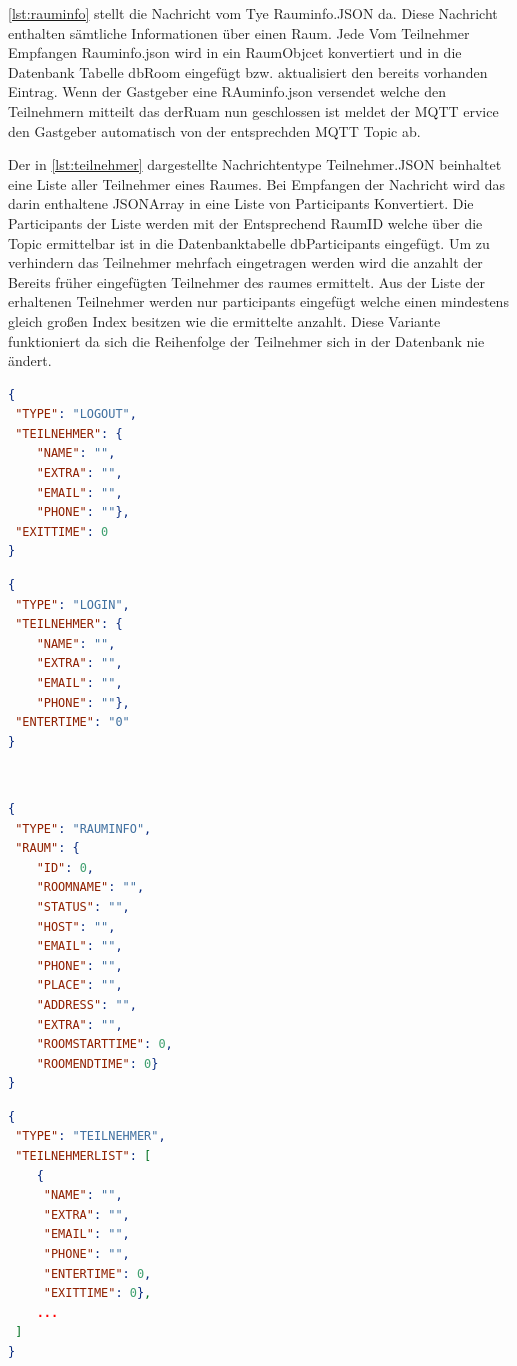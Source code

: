 \cref{lst:rauminfo} stellt die Nachricht vom Tye Rauminfo.JSON da. Diese Nachricht enthalten sämtliche Informationen über einen Raum. Jede Vom Teilnehmer Empfangen Rauminfo.json wird in ein RaumObjcet konvertiert und in die Datenbank Tabelle dbRoom eingefügt bzw. aktualisiert den bereits vorhanden Eintrag. Wenn der Gastgeber eine RAuminfo.json versendet welche den Teilnehmern mitteilt das derRuam nun geschlossen ist meldet der MQTT ervice den Gastgeber automatisch von der entsprechden MQTT Topic ab.

Der in \cref{lst:teilnehmer} dargestellte Nachrichtentype Teilnehmer.JSON beinhaltet eine Liste aller Teilnehmer eines Raumes. Bei Empfangen der Nachricht wird das darin enthaltene JSONArray in eine Liste von Participants Konvertiert. Die Participants der Liste werden mit der Entsprechend RaumID welche über die Topic ermittelbar ist in die Datenbanktabelle dbParticipants eingefügt. Um zu verhindern das Teilnehmer mehrfach eingetragen werden wird die anzahlt der Bereits früher eingefügten Teilnehmer des raumes ermittelt. Aus der Liste der erhaltenen Teilnehmer werden nur participants eingefügt welche einen mindestens gleich großen Index besitzen wie die ermittelte anzahlt. Diese Variante funktioniert da sich die Reihenfolge der Teilnehmer sich in der Datenbank nie ändert.

\begin{minipage}[t]{0.45\linewidth}
\begin{lstlisting}[language=json, label={lst:anmeldung}, caption={anmeldung.json}]
{
 "TYPE": "LOGOUT",
 "TEILNEHMER": {
	"NAME": "",
	"EXTRA": "",
	"EMAIL": "",
	"PHONE": ""},
 "EXITTIME": 0
}
\end{lstlisting}
\end{minipage}
\qquad
\begin{minipage}[t]{0.45\linewidth}
\begin{lstlisting}[language=json,label={lst:abmeldung}, caption={abmeldung.json}]
{
 "TYPE": "LOGIN",
 "TEILNEHMER": {
	"NAME": "",
	"EXTRA": "",
	"EMAIL": "",
	"PHONE": ""},
 "ENTERTIME": "0"
}
\end{lstlisting}
\end{minipage}
\\
\begin{minipage}[t]{0.45\linewidth}
\begin{lstlisting}[language=json, label={lst:rauminfo}, caption={rauminfo.json}]
{
 "TYPE": "RAUMINFO",
 "RAUM": {
	"ID": 0,
	"ROOMNAME": "",
	"STATUS": "",
	"HOST": "",
	"EMAIL": "",
	"PHONE": "",
	"PLACE": "",
	"ADDRESS": "",
	"EXTRA": "",
	"ROOMSTARTTIME": 0,
	"ROOMENDTIME": 0}
}
\end{lstlisting}
\end{minipage}
\qquad
\begin{minipage}[t]{0.45\linewidth}
\begin{lstlisting}[language=json, label={lst:teilnehmer}, caption={teilnehmer.JSON}]
{
 "TYPE": "TEILNEHMER",
 "TEILNEHMERLIST": [
	{
	 "NAME": "",
	 "EXTRA": "",
 	 "EMAIL": "",
 	 "PHONE": "",
 	 "ENTERTIME": 0,
	 "EXITTIME": 0},
	...
 ]
}
\end{lstlisting}
\end{minipage}
\label{sec:MQTT Service}
